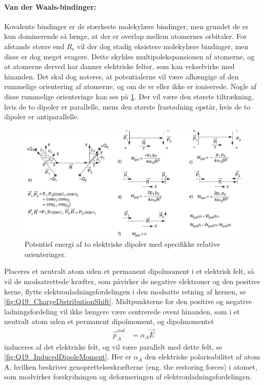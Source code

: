 \paragraph{Van der Waals-bindinger:} Kovalente bindinger er de stærkeste molekylære bindinger, men grundet de er kun dominerende så længe, at der er overlap mellem atomernes orbitaler. For afstande større end $R_c$ vil der dog stadig eksistere molekylære bindinger, men disse er dog meget svagere. Dette skyldes multipolekspansionen af atomerne, og at atomerne derved har danner elektriske felter, som kan vekselvirke med hinanden. Det skal dog noteres, at potentialerne vil være afhængige af den rummelige orientering af atomerne, og om de er eller ikke er ioniserede. Nogle af disse rummelige orienteringe kan ses på \cref{fig:Q19_RummeligeOrienteringer}. Der vil være den største tiltrækning, hvis de to dipoler er parallelle, mens den største frastødning opstår, hvis de to dipoler er antiparallelle.

\begin{figure}[!h]
    \centering
    \includegraphics[width=\textwidth]{Q19/images/EnergiAfDipolerVedSpecifikkeKonfigurationer.PNG}
    \caption{Potentiel energi af to elektriske dipoler med specifikke relative orienteringer.}
    \label{fig:Q19_RummeligeOrienteringer}
\end{figure}

Placeres et neutralt atom uden et permanent dipolmoment i et elektrisk felt, så vil de modsatrettede kræfter, som påvirker de negative elektroner og den positive kerne, flytte elektronladningsfordelingen i den modsatte retning af kernen, se \cref{fig:Q19_ChargeDistributionShift}. Midtpunkterne for den positive og negative ladningsfordeling vil ikke længere være centrerede oveni hinanden, som i et neutralt atom uden et permanent dipolmoment, og dipolmomentet
\begin{align}
    \Vec{p}_A^{ind} &= \alpha_A \Vec{E}
\end{align}
induceres af det elektriske felt, og vil være parallelt med dette felt, se \cref{fig:Q19_InducedDipoleMoment}. Her er $\alpha_A$ den elektriske polarisabilitet af atom A, hvilken beskriver genoprettelseskræfterne (eng. the restoring forces) i atomet, som modvirker forskydningen og deformeringen af elektronladningsfordelingen.

